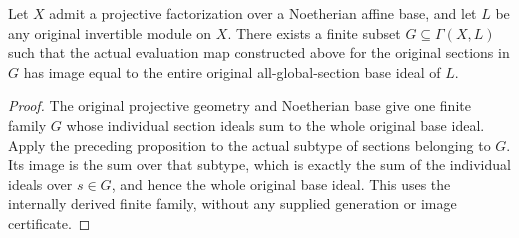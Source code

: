 \begin{corollary}
\label{cor:actual-projective-section-family-image}
Let $X$ admit a projective factorization over a Noetherian affine base,
and let $L$ be any original invertible module on $X$. There exists a
finite subset $G\subseteq\Gamma(X,L)$ such that the actual evaluation
map constructed above for the original sections in $G$ has image equal
to the entire original all-global-section base ideal of $L$.
\leanok
\end{corollary}
\begin{proof}
The original projective geometry and Noetherian base give one finite
family $G$ whose individual section ideals sum to the whole original
base ideal. Apply the preceding proposition to the actual subtype of
sections belonging to $G$. Its image is the sum over that subtype,
which is exactly the sum of the individual ideals over $s\in G$, and
hence the whole original base ideal. This uses the internally derived
finite family, without any supplied generation or image certificate.
\end{proof}
